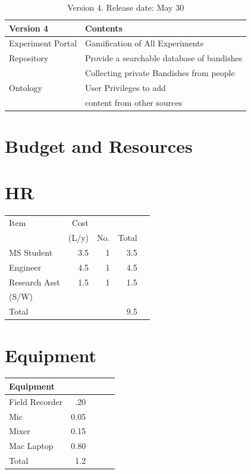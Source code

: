 \documentclass{tufte-handout}
\begin{document}
\begin{table}[h]
\begin{tabular}{ll}
\toprule
Version 4                    & Contents      \\
\midrule
Experiment Portal              & Gamification of All Experiments\\
Repository                     & Provide a searchable database of bandishes\\
 & Collecting private Bandishes from people\\
Ontology & User Privileges to add \\ 
& content from other sources\\
\bottomrule    
\end{tabular}
\caption{Version 4. Release date: May 30}
\end{table}

\section{Budget and Resources }
\label{sec-1}
\section{HR}
\label{sec-1-1}


\begin{center}
\begin{tabular}{lrrrl}
\hline
 Item           &   Cost  &       &         &     \\
                &  (L/y)  &  No.  &  Total  &     \\
\hline
 MS Student     &    3.5  &    1  &    3.5  &     \\
\hline
 Engineer       &    4.5  &    1  &    4.5  &     \\
\hline
 Research Asst  &    1.5  &    1  &    1.5  &     \\
 (S/W)          &         &       &         &     \\
\hline
 Total          &         &       &    9.5  &     \\
\hline
\end{tabular}
\end{center}
\section{Equipment}
\label{sec-1-2}



\begin{center}
\begin{tabular}{lrlll}
\hline
 Equipment       &        &     &     &     \\
\hline
 Field Recorder  &   .20  &     &     &     \\
\hline
 Mic             &  0.05  &     &     &     \\
\hline
 Mixer           &  0.15  &     &     &     \\
\hline
 Mac Laptop      &  0.80  &     &     &     \\
\hline
 Total           &   1.2  &     &     &     \\
\hline
\end{tabular}
\end{center}
\end{document}
